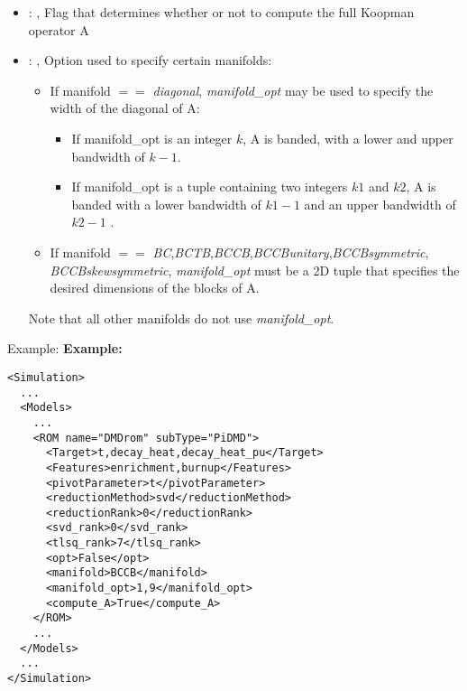 \begin{itemize}
    \item {}: , 
      Flag that determines whether or not to compute the full Koopman operator A

    \item {}: , 
      Option used to specify certain manifolds:
      \begin{itemize}                                                    \item If manifold $==$
      \textit{diagonal}, \textit{manifold\_opt} may be used to specify the width of the diagonal of
      A:                                                    \begin{itemize}
      \item If manifold\_opt is an integer $k$, A is banded, with a lower and upper bandwidth of
      $k-1$.                                                      \item If manifold\_opt is a tuple
      containing two integers $k1$ and $k2$, A is banded with
      a lower bandwidth of $k1-1$ and an upper bandwidth of $k2-1$
      .   \end{itemize}                                                    \item If manifold $==$
      \textit{BC},\textit{BCTB},\textit{BCCB},\textit{BCCBunitary},\textit{BCCBsymmetric},
      \textit{BCCBskewsymmetric}, \textit{manifold\_opt} must be a 2D tuple that specifies the
      desired dimensions                                                       of the blocks of A.
      \end{itemize}                                                   Note that all other manifolds
      do not use \textit{manifold\_opt}.
  \end{itemize}

\hspace{24pt}
Example:
\textbf{Example:}
\begin{lstlisting}[style=XML,morekeywords={name,subType}]
<Simulation>
  ...
  <Models>
    ...
    <ROM name="DMDrom" subType="PiDMD">
      <Target>t,decay_heat,decay_heat_pu</Target>
      <Features>enrichment,burnup</Features>
      <pivotParameter>t</pivotParameter>
      <reductionMethod>svd</reductionMethod>
      <reductionRank>0</reductionRank>
      <svd_rank>0</svd_rank>
      <tlsq_rank>7</tlsq_rank>
      <opt>False</opt>
      <manifold>BCCB</manifold>
      <manifold_opt>1,9</manifold_opt>
      <compute_A>True</compute_A>
    </ROM>
    ...
  </Models>
  ...
</Simulation>
\end{lstlisting}

